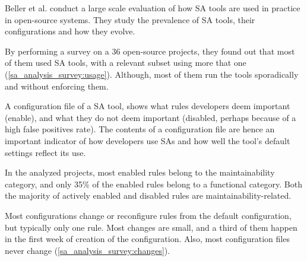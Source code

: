  Beller et al. \cite{analysis_sa_usage} conduct a large scale evaluation of how SA tools are used in practice in open-source systems. They study the prevalence of SA tools, their configurations and how they evolve.

 By performing a survey on a 36 open-source projects, they found out that most of them used SA tools, with a relevant subset using more that one (\cref{sa_analysis_survey:usage}). Although, most of them run the tools sporadically and without enforcing them.

 A configuration file of a SA tool, shows what rules developers deem important (enable), and what they do not deem important (disabled, perhaps because of a high false positives rate). The contents of a configuration file are hence an important indicator of how developers use SAs and how well the tool’s default settings reflect its use.

 In the analyzed projects, most enabled rules belong to the maintainability category, and only 35\% of the enabled rules belong to a functional category. Both the majority of actively enabled and disabled rules are maintainability-related.

 Most configurations change or reconfigure rules from the default configuration, but typically only one rule. Most changes are small, and a third of them happen in the first week of creation of the configuration. Also, most configuration files never change (\cref{sa_analysis_survey:changes}).

